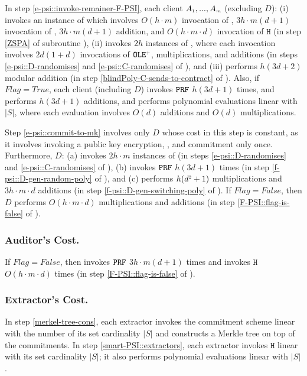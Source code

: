 In step \ref{e-psi::invoke-remainer-F-PSI}, each client   $A_{\scriptscriptstyle  1},...,    A_{\scriptscriptstyle   m}$ (excluding $D$): (i) invokes an instance of \zspaa which involves $O(h\cdot m)$ invocation of \ct, $3h\cdot m (d+1)$ invocation of \prf, $3h\cdot m (d+1)$ addition, and $O(h\cdot m\cdot d)$ invocation of $\mathtt{H}$ (in step \ref{ZSPA} of subroutine \fpsi), (ii) invokes $2h$ instances of \vopr, where each \vopr invocation involves $2d(1+d)$ invocations of $\mathtt{OLE}^{\scriptscriptstyle +}$, multiplications, and additions  (in steps \ref{e-psi::D-randomises} and \ref{e-psi::C-randomises} of \fpsi), and (iii) performs $h(3d+2)$ modular addition (in step \ref{blindPoly-C-sends-to-contract} of  \fpsi).  
 Also, if $Flag=True$, each client (including $D$) invokes $\mathtt{PRF}$ $h (3d+1)$ times, and performs $h (3d+1)$ additions, and performs polynomial evaluations linear with $|S|$, where each evaluation involves  $O(d)$  additions and $O(d)$ multiplications.%
 
 Step \ref{e-psi::commit-to-mk} involves only $D$ whose cost in this step is constant, as it involves invoking a public key encryption, \prf,  and commitment only once. Furthermore, $D$:  (a) invokes $2h\cdot m$ instances of \vopr  (in steps \ref{e-psi::D-randomises} and \ref{e-psi::C-randomises} of \fpsi), (b) invokes $\mathtt{PRF}$ $h(3d+1)$ times (in step \ref{f-psi::D-gen-random-poly} of \fpsi), and (c) performs $h(d^{\scriptscriptstyle 2}+1)$ multiplications and $3h\cdot m\cdot d$ additions (in step \ref{f-psi::D-gen-switching-poly} of \fpsi). If $Flag=False$, then $D$ performs $O(h\cdot m\cdot d)$ multiplications and additions (in step \ref{F-PSI::flag-is-false} of \fpsi).  

\vspace{-3mm}
 \subsubsection{Auditor's Cost.}
 
If $Flag=False$, then \aud invokes $\mathtt{PRF}$ $3h\cdot m(d+1)$ times  and  invokes $\mathtt{H}$ $O(h\cdot m\cdot d)$ times (in step \ref{F-PSI::flag-is-false} of \fpsi). 


\vspace{-3.4mm}
 \subsubsection{Extractor's Cost.}
 
 
 In step \ref{merkel-tree-cons}, each extractor invokes the commitment scheme linear with the number of its set cardinality $|S|$ and constructs a Merkle tree on top of the commitments. %
%
In step \ref{smart-PSI::extractors}, each extractor invokes $\mathtt{H}$ linear with its set cardinality $|S|$; it also performs polynomial evaluations linear with $|S|$. 


